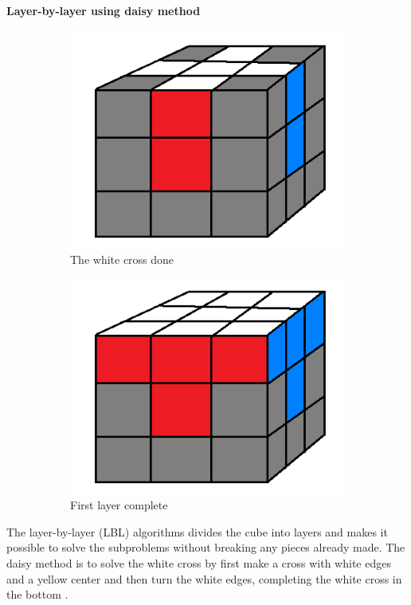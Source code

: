 \documentclass[a4paper,11pt]{kth-mag}
\begin{document}
\paragraph{Layer-by-layer using daisy method}
\begin{figure}
	\centering
	\begin{subfigure}[!b]{0.3\textwidth}
		\includegraphics[width=\textwidth]{figs/step1.png}
		\caption{The white cross done}
		\label{fig_4}
	\end{subfigure}
	\begin{subfigure}[!b]{0.3\textwidth}
		\includegraphics[width=\textwidth]{figs/step2.png}
		\caption{First layer complete}
		\label{fig_5}
	\end{subfigure}
	\caption{}
\end{figure}
The layer-by-layer (LBL) algorithms divides the cube into layers and makes it possible to solve the subproblems without breaking any pieces already made. 
The daisy method is to solve the white cross by first make a cross with white edges and a yellow center and then turn the white edges, completing the white cross in the bottom \cite{Shellie}.
\end{document}
